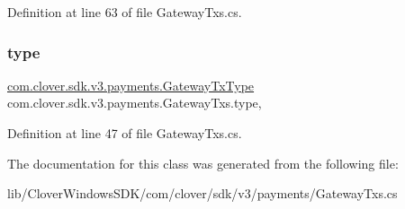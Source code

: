 Definition at line 63 of file Gateway\+Txs.\+cs.

\mbox{\label{classcom_1_1clover_1_1sdk_1_1v3_1_1payments_1_1_gateway_txs_a5e9c7fbc2da3548484e2b1ea42890769}} 
\subsubsection{\texorpdfstring{type}{type}}
{\footnotesize\ttfamily \hyperlink{namespacecom_1_1clover_1_1sdk_1_1v3_1_1payments_a3df1de2debbb23f9584db68737e035e7}{com.\+clover.\+sdk.\+v3.\+payments.\+Gateway\+Tx\+Type} com.\+clover.\+sdk.\+v3.\+payments.\+Gateway\+Txs.\+type\hspace{0.3cm}{\ttfamily [get]}, {\ttfamily [set]}}



Definition at line 47 of file Gateway\+Txs.\+cs.



The documentation for this class was generated from the following file\+:\begin{DoxyCompactItemize}
\item 
lib/\+Clover\+Windows\+S\+D\+K/com/clover/sdk/v3/payments/Gateway\+Txs.\+cs\end{DoxyCompactItemize}
